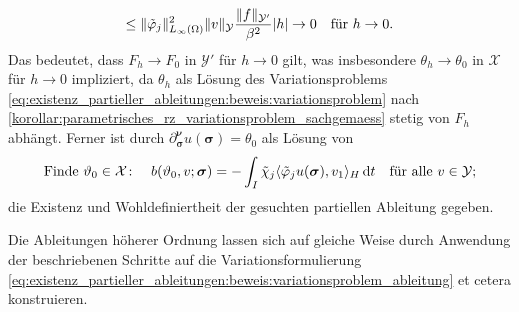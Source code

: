\documentclass[../main.tex]{subfiles}
\begin{document}
\begin{Satz}
\begin{Beweis}
\begin{equation}
            \leq \lVert\tilde{\varphi}_{j}\rVert^{2}_{L_{\infty}(\Omega)} \lVert v\rVert_{\mathcal Y} \frac{\lVert f\rVert_{\mathcal Y'}}{\beta^{2}} \lvert h\rvert \to 0 \quad \text{für}~h \to 0.
        \end{equation}
        Das bedeutet, dass $F_{h} \to F_{0}$ in $\mathcal Y'$ für $h \to 0$ gilt,
        was insbesondere $\theta_{h} \to \theta_{0}$ in $\mathcal X$ für $h \to 0$ impliziert, da $\theta_{h}$ als Lösung des Variationsproblems \cref{eq:existenz_partieller_ableitungen:beweis:variationsproblem} nach \cref{korollar:parametrisches_rz_variationsproblem_sachgemaess} stetig von $F_{h}$ abhängt.
        Ferner ist durch $\partial^{\bm\nu}_{\bm\sigma} u(\bm\sigma) = \theta_{0}$ als Lösung von
        \begin{equation}
            \label{eq:existenz_partieller_ableitungen:beweis:variationsproblem_ableitung}
            \text{Finde}~\theta_{0} \in \mathcal X \colon \quad b(\theta_{0}, v; \bm\sigma) = - \int_{I} \tilde{\chi}_{j} \skp{\tilde{\varphi}_{j}  u(\bm\sigma)}{v_{1}}{H} \diff t \quad \fa v \in \mathcal Y;
        \end{equation}
        die Existenz und Wohldefiniertheit der gesuchten partiellen Ableitung gegeben.

        Die Ableitungen höherer Ordnung lassen sich auf gleiche Weise durch Anwendung der beschriebenen Schritte auf die Variationsformulierung \cref{eq:existenz_partieller_ableitungen:beweis:variationsproblem_ableitung} et cetera konstruieren.
    \end{Beweis}
\end{Satz}
\end{document}
